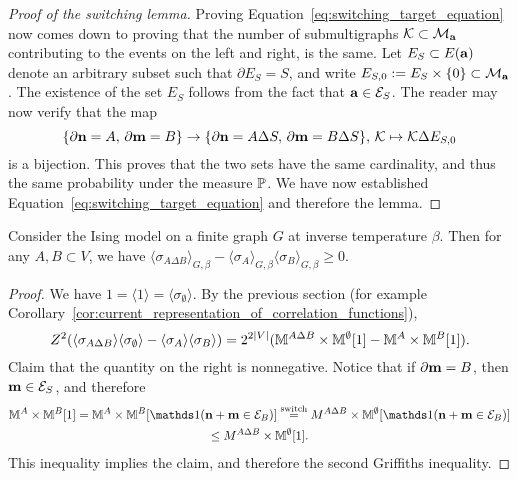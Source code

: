 \begin{proof}[Proof of the switching lemma]
    Proving Equation~\eqref{eq:switching_target_equation} now comes down to
    proving that the number of submultigraphs $\calK\subset\calM_\a$ contributing
    to the events on the left and right, is the same.
    Let $E_S\subset E(\a)$ denote an arbitrary subset such that $\partial E_S=S$,
    and write $E_{S,0}:=E_S\times\{0\}\subset\calM_\a$.
    The existence of the set $E_S$ follows from the fact that $\a\in\calE_S$.
    The reader may now verify that the map
    \[
        \{\partial\n=A,\,\partial\m=B\}
        \to
        \{\partial\n=A\Delta S,\,\partial\m=B\Delta S\}
        ,\,
        \calK\mapsto \calK\Delta E_{S,0}
    \]
    is a bijection.
    This proves that the two sets have the same cardinality,
    and thus the same probability under the measure $\P$.
    We have now established Equation~\eqref{eq:switching_target_equation}
    and therefore the lemma.
\end{proof}

\begin{corollary}
    Consider the Ising model on a finite graph $G$ at inverse temperature $\beta$.
    Then for any $A,B\subset V$, we have
    $\langle\sigma_{A\Delta B}\rangle_{G,\beta}-\langle\sigma_A\rangle_{G,\beta}\langle\sigma_B\rangle_{G,\beta}\geq 0$.
\end{corollary}

\begin{proof}
    We have $1=\langle1\rangle=\langle\sigma_\emptyset\rangle$.
    By the previous section (for example Corollary~\ref{cor:current_representation_of_correlation_functions}),
    \[
    Z^2
    (\langle\sigma_{A\Delta B}\rangle\langle\sigma_\emptyset\rangle-\langle\sigma_A\rangle\langle\sigma_B\rangle)
    =
    2^{2|V|}
    (
    \M^{A\Delta B}\times\M^\emptyset[1]
    -
    \M^A\times\M^B[1]
    ).
    \]
    Claim that the quantity on the right is nonnegative.
    Notice that if $\partial\m= B$, then $\m\in\calE_S$,
    and therefore
    \begin{multline}
        \M^A\times\M^B[1]
        =
        \M^A\times\M^B[\true{\n+\m\in\calE_B}]
        \stackrel{\text{switch}}=
        M^{A\Delta B}\times\M^\emptyset[\true{\n+\m\in\calE_B}]
        \\
        \leq
        M^{A\Delta B}\times\M^\emptyset[1].
    \end{multline}
    This inequality implies the claim, and therefore the second Griffiths inequality.
\end{proof}

